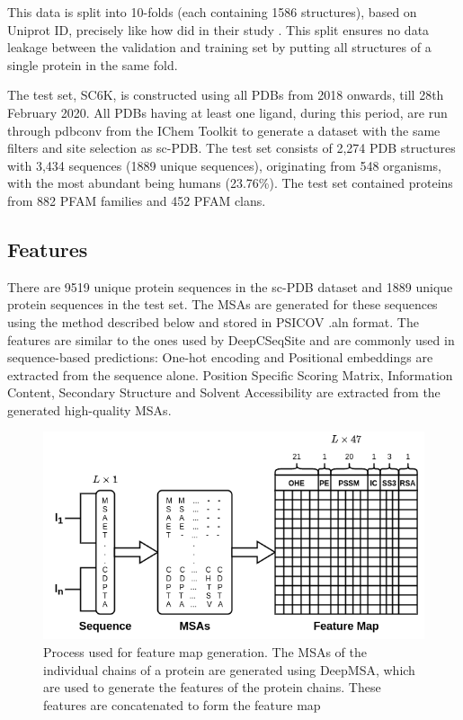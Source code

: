 \documentclass[journal=jacsat,manuscript=article]{achemso}
\begin{document}
This data is split into 10-folds (each containing 1586 structures), based on Uniprot ID, precisely like how \citeauthor{stepniewska2020improving} did in their study \cite{stepniewska2020improving}. This split ensures no data leakage between the validation and training set by putting all structures of a single protein in the same fold.

The test set, SC6K, is constructed using all PDBs from 2018 onwards, till 28th February 2020. All PDBs having at least one ligand, during this period, are run through pdbconv from the IChem Toolkit \cite{da2018ichem} to generate a dataset with the same filters and site selection as sc-PDB\cite{desaphy2015sc}. The test set consists of 2,274 PDB structures with 3,434 sequences (1889 unique sequences), originating from 548 organisms, with the most abundant being humans (23.76\%). The test set contained proteins from 882 PFAM families and 452 PFAM clans.

\subsection{Features}
\quad There are 9519 unique protein sequences in the sc-PDB\cite{desaphy2015sc} dataset and 1889 unique protein sequences in the test set. The MSAs are generated for these sequences using the method described below and stored in PSICOV \cite{jones2012psicov} .aln format. The features are similar to the ones used by DeepCSeqSite\cite{cui2019predicting} and are commonly used in sequence-based predictions: One-hot encoding and Positional embeddings are extracted from the sequence alone. Position Specific Scoring Matrix, Information Content, Secondary Structure and Solvent Accessibility are extracted from the generated high-quality MSAs.

\begin{figure}
    \centering
    \noindent\includegraphics[scale=0.6]{feature_map}
    \caption{\centering Process used for feature map generation. The MSAs of the individual chains of a protein are generated using DeepMSA, which are used to generate the features of the protein chains. These features are concatenated to form the feature map}
    \label{fig:feature_map}
\end{figure}
\end{document}
